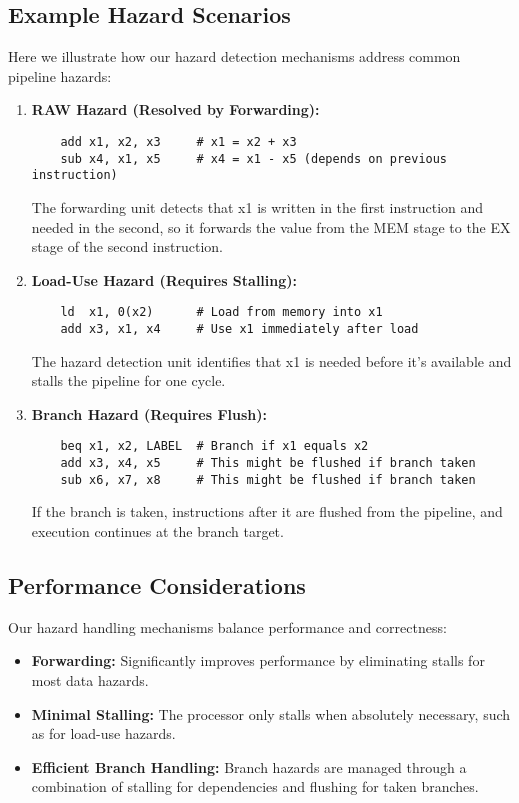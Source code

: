 \documentclass[conference]{IEEEtran}
\begin{document}
\subsection{Example Hazard Scenarios}
Here we illustrate how our hazard detection mechanisms address common pipeline hazards:

\begin{enumerate}
    \item \textbf{RAW Hazard (Resolved by Forwarding):}
    \begin{verbatim}
    add x1, x2, x3     # x1 = x2 + x3
    sub x4, x1, x5     # x4 = x1 - x5 (depends on previous instruction)
    \end{verbatim}
    The forwarding unit detects that x1 is written in the first instruction and needed in the second, so it forwards the value from the MEM stage to the EX stage of the second instruction.
    
    \item \textbf{Load-Use Hazard (Requires Stalling):}
    \begin{verbatim}
    ld  x1, 0(x2)      # Load from memory into x1
    add x3, x1, x4     # Use x1 immediately after load
    \end{verbatim}
    The hazard detection unit identifies that x1 is needed before it's available and stalls the pipeline for one cycle.
    
    \item \textbf{Branch Hazard (Requires Flush):}
    \begin{verbatim}
    beq x1, x2, LABEL  # Branch if x1 equals x2
    add x3, x4, x5     # This might be flushed if branch taken
    sub x6, x7, x8     # This might be flushed if branch taken
    \end{verbatim}
    If the branch is taken, instructions after it are flushed from the pipeline, and execution continues at the branch target.
\end{enumerate}

\subsection{Performance Considerations}
Our hazard handling mechanisms balance performance and correctness:

\begin{itemize}
    \item \textbf{Forwarding:} Significantly improves performance by eliminating stalls for most data hazards.
    
    \item \textbf{Minimal Stalling:} The processor only stalls when absolutely necessary, such as for load-use hazards.
    
    \item \textbf{Efficient Branch Handling:} Branch hazards are managed through a combination of stalling for dependencies and flushing for taken branches.
\end{itemize}
\end{document}
